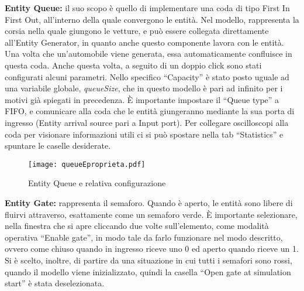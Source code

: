 \textbf{Entity Queue\cite{entityqueue}:} il suo scopo è quello di implementare una coda di tipo First In First Out, all’interno della quale convergono le entità. Nel modello, rappresenta la corsia nella quale giungono le vetture, e può essere collegata direttamente all’Entity Generator, in quanto anche questo componente lavora con le entità. Una volta che un’automobile viene generata, essa automaticamente confluisce in questa coda. Anche questa volta, a seguito di un doppio click sono stati configurati alcuni parametri. Nello specifico “Capacity” è stato posto uguale ad una variabile globale, \textit{queueSize}, che in questo modello è pari ad infinito per i motivi già spiegati in precedenza. È importante impostare il “Queue type” a FIFO, e comunicare alla coda che le entità giungeranno mediante la sua porta di ingresso (Entity arrival source pari a Input port). Per collegare oscilloscopi alla coda per visionare informazioni utili ci si può spostare nella tab “Statistics” e spuntare le caselle desiderate.
\newline
\begin{figure}[H]
  \texttt{[image: queueEproprieta.pdf]}
  \caption{Entity Queue e relativa configurazione}
  \label{fig:entityqueueprops}
\end{figure}
\newpage
\textbf{Entity Gate\cite{entitygate}:} rappresenta il semaforo. Quando è aperto, le entità sono libere di fluirvi attraverso, esattamente come un semaforo verde. È importante selezionare, nella finestra che si apre cliccando due volte sull’elemento, come modalità operativa “Enable gate”, in modo tale da farlo funzionare nel modo descritto, ovvero come chiuso quando in ingresso riceve uno 0 ed aperto quando riceve un 1. Si è scelto, inoltre, di partire da una situazione in cui tutti i semafori sono rossi, quando il modello viene inizializzato, quindi la casella “Open gate at simulation start” è stata deselezionata. 

